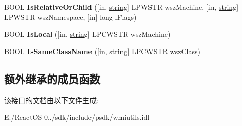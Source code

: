 \begin{DoxyCompactItemize}
\item 
\mbox{\label{interface_i_wbem_path_ac8ad649f9d44dfec1d811e42a78b1cb1}} 
B\+O\+OL {\bfseries Is\+Relative\+Or\+Child} (\mbox{[}in, \hyperlink{structstring}{string}\mbox{]} L\+P\+W\+S\+TR wsz\+Machine, \mbox{[}in, \hyperlink{structstring}{string}\mbox{]} L\+P\+W\+S\+TR wsz\+Namespace, \mbox{[}in\mbox{]} long l\+Flags)
\item 
\mbox{\label{interface_i_wbem_path_a2d1ce054e3f9f1525c980270bc1feda1}} 
B\+O\+OL {\bfseries Is\+Local} (\mbox{[}in, \hyperlink{structstring}{string}\mbox{]} L\+P\+C\+W\+S\+TR wsz\+Machine)
\item 
\mbox{\label{interface_i_wbem_path_a69e047231b337c0d22af323ecce63e18}} 
B\+O\+OL {\bfseries Is\+Same\+Class\+Name} (\mbox{[}in, \hyperlink{structstring}{string}\mbox{]} L\+P\+C\+W\+S\+TR wsz\+Class)
\end{DoxyCompactItemize}
\subsection*{额外继承的成员函数}


该接口的文档由以下文件生成\+:\begin{DoxyCompactItemize}
\item 
E\+:/\+React\+O\+S-\/0../sdk/include/psdk/wmiutils.\+idl\end{DoxyCompactItemize}
